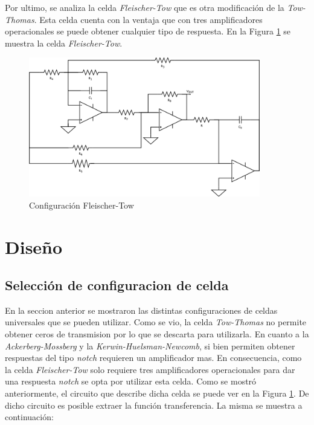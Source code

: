 Por ultimo, se analiza la celda \textit{Fleischer-Tow} que es otra modificación de la \textit{Tow-Thomas}. Esta celda cuenta con la ventaja que con tres amplificadores operacionales se puede obtener cualquier tipo de respuesta. En la Figura \ref{fig:celda_ft} se muestra la celda \textit{Fleischer-Tow}.


\begin{figure}[h!]                                                       
    \centering\includegraphics[width=0.9\textwidth]{../Ex4/Resources/ej4_FT.png}
    \caption{Configuración Fleischer-Tow}
    \label{fig:celda_ft}
    \end{figure}


\section{Diseño}

\subsection{Selección de configuracion de celda}
En la seccion anterior se mostraron las distintas configuraciones de celdas universales que se pueden utilizar. Como se vio, la celda \textit{Tow-Thomas} no permite obtener ceros de transmision por lo que se descarta para utilizarla. En cuanto a la \textit{Ackerberg-Mossberg} y la \textit{Kerwin-Huelsman-Newcomb}, si bien permiten obtener respuestas del tipo \textit{notch} requieren un amplificador mas. En consecuencia, como la celda \textit{Fleischer-Tow} solo requiere tres amplificadores operacionales para dar una respuesta \textit{notch} se opta por utilizar esta celda.  Como se mostró anteriormente, el circuito que describe dicha celda se puede ver en la Figura \ref{fig:celda_ft}. De dicho circuito es posible extraer la función transferencia. La misma se muestra a continuación:


